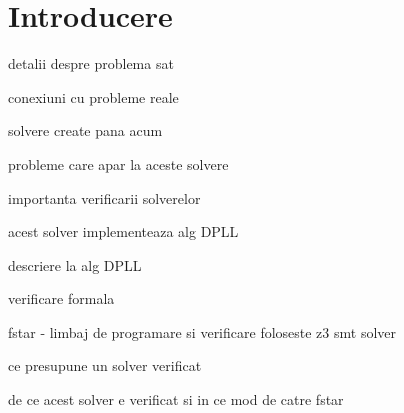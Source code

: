 \chapter*{Introducere} 

detalii despre problema sat

conexiuni cu probleme reale

solvere create pana acum

probleme care apar la aceste solvere

importanta verificarii solverelor

acest solver implementeaza alg DPLL

descriere la alg DPLL

verificare formala

fstar - limbaj de programare si verificare
 foloseste z3 smt solver
 
ce presupune un solver verificat

de ce acest solver e verificat si in ce mod de catre fstar


